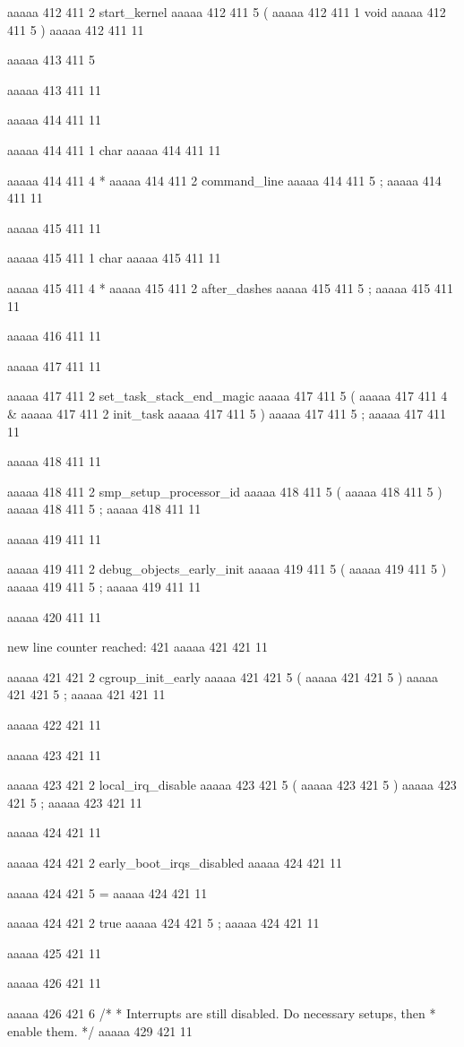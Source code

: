 aaaaa 412 411
2
start_kernel
aaaaa 412 411
5
(
aaaaa 412 411
1
void
aaaaa 412 411
5
)
aaaaa 412 411
11


aaaaa 413 411
5
{
aaaaa 413 411
11


aaaaa 414 411
11
	
aaaaa 414 411
1
char
aaaaa 414 411
11
 
aaaaa 414 411
4
*
aaaaa 414 411
2
command_line
aaaaa 414 411
5
;
aaaaa 414 411
11


aaaaa 415 411
11
	
aaaaa 415 411
1
char
aaaaa 415 411
11
 
aaaaa 415 411
4
*
aaaaa 415 411
2
after_dashes
aaaaa 415 411
5
;
aaaaa 415 411
11


aaaaa 416 411
11


aaaaa 417 411
11
	
aaaaa 417 411
2
set_task_stack_end_magic
aaaaa 417 411
5
(
aaaaa 417 411
4
&
aaaaa 417 411
2
init_task
aaaaa 417 411
5
)
aaaaa 417 411
5
;
aaaaa 417 411
11


aaaaa 418 411
11
	
aaaaa 418 411
2
smp_setup_processor_id
aaaaa 418 411
5
(
aaaaa 418 411
5
)
aaaaa 418 411
5
;
aaaaa 418 411
11


aaaaa 419 411
11
	
aaaaa 419 411
2
debug_objects_early_init
aaaaa 419 411
5
(
aaaaa 419 411
5
)
aaaaa 419 411
5
;
aaaaa 419 411
11


aaaaa 420 411
11


new line counter reached: 421
aaaaa 421 421
11
	
aaaaa 421 421
2
cgroup_init_early
aaaaa 421 421
5
(
aaaaa 421 421
5
)
aaaaa 421 421
5
;
aaaaa 421 421
11


aaaaa 422 421
11


aaaaa 423 421
11
	
aaaaa 423 421
2
local_irq_disable
aaaaa 423 421
5
(
aaaaa 423 421
5
)
aaaaa 423 421
5
;
aaaaa 423 421
11


aaaaa 424 421
11
	
aaaaa 424 421
2
early_boot_irqs_disabled
aaaaa 424 421
11
 
aaaaa 424 421
5
=
aaaaa 424 421
11
 
aaaaa 424 421
2
true
aaaaa 424 421
5
;
aaaaa 424 421
11


aaaaa 425 421
11


aaaaa 426 421
11
	
aaaaa 426 421
6
/*
	 * Interrupts are still disabled. Do necessary setups, then
	 * enable them.
	 */
aaaaa 429 421
11


}
